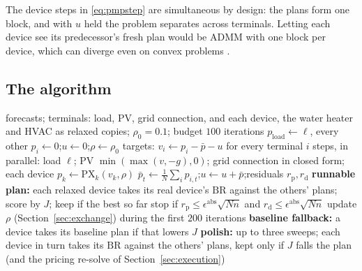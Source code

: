 \documentclass[11pt,a4paper]{article}
\newcommand{\PX}{\mathrm{PX}}
\newcommand{\BR}{\mathrm{BR}}
\begin{document}
The device steps in \eqref{eq:pmpstep} are simultaneous by design: the plans form
one block, and with $u$ held the problem separates across terminals. Letting each
device see its predecessor's fresh plan would be ADMM with one block per device,
which can diverge even on convex problems \cite{chen2016}.

\subsection{The algorithm}
\label{sec:admmalg}

\begin{algorithm}[H]
\caption{ADMM planning cycle, as implemented (\texttt{admm.coordinator}).}
\label{alg:admm}
\begin{algorithmic}[1]
\Require forecasts; terminals: load, PV, grid connection, and each device, the
  water heater and HVAC as relaxed copies; $\rho_0 = 0.1$; budget $100$ iterations
\State $p_{\mathrm{load}} \gets \ell$, every other $p_i \gets 0$;\quad $u \gets 0$;\quad $\rho \gets \rho_0$
  \State targets: $v_i \gets p_i - \bar p - u$ for every terminal $i$
  \State steps, in parallel: load $\ell$; PV $\min(\max(v, -g), 0)$; grid connection in closed form;
    each device $p_k \gets \PX_k(v_k, \rho)$
  \State $\bar p_t \gets \frac1N\sum_i p_{i,t}$;\quad $u \gets u + \bar p$;\quad residuals $r_{\mathrm p}, r_{\mathrm d}$
  \State \textbf{runnable plan:} each relaxed device takes its real device's $\BR$ against the
    others' plans; score by $J$; keep if the best so far
  \State stop if $r_{\mathrm p} \le \epsilon^{\mathrm{abs}}\sqrt{Nn}$ and $r_{\mathrm d} \le \epsilon^{\mathrm{abs}}\sqrt{Nn}$
  \State update $\rho$ (Section~\ref{sec:exchange}) during the first $200$ iterations
\EndFor
\State \textbf{baseline fallback:} a device takes its baseline plan if that lowers $J$
\State \textbf{polish:} up to three sweeps; each device in turn takes its $\BR$ against the
  others' plans, kept only if $J$ falls
\State \Return the plan (and the pricing re-solve of Section~\ref{sec:execution})
\end{algorithmic}
\end{algorithm}
\end{document}
